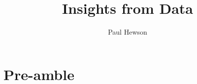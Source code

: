 \usepackage{graphicx}
\usepackage{keystroke}
\usepackage{marvosym}
\usepackage{ifsym}
\usepackage{tikz}
\usepackage[tikz]{bclogo}
\usetikzlibrary{arrows,decorations,backgrounds,fit,positioning,calc}
\author{Paul Hewson}
\title{Insights from Data}

\newcommand{\A}{{\color{green}A}}
\newcommand{\B}{{\color{red}B}}
\newcommand{\C}{{\color{blue}C}}
\newcommand{\R}{{\color{red}R}}

\makeatletter
\newcommand{\Repeat}[1]{%
    \expandafter\@Repeat\expandafter{\the\numexpr #1\relax}%
}

\def\@Repeat#1{%
    \ifnum#1>0
        \expandafter\@@Repeat\expandafter{\the\numexpr #1-1\expandafter\relax\expandafter}%
    \else
        \expandafter\@gobble
    \fi
}
\def\@@Repeat#1#2{%
    \@Repeat{#1}{#2}#2%
}
\makeatother











\section{Pre-amble}


